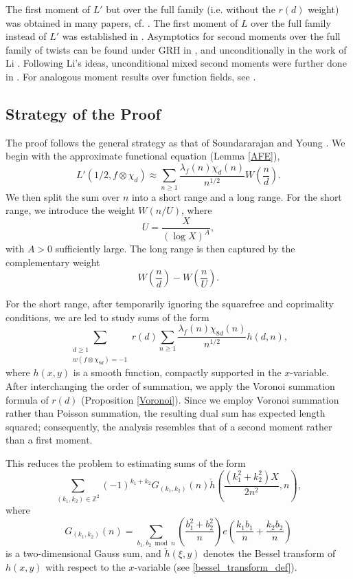 \documentclass[12pt]{amsart}
\def\log{\operatorname{log}}
\begin{document}
The first moment of $L'$ but over the full family (i.e. without the $r(d)$ weight) was obtained in many papers, cf. \cite{MurtyMurty,iwaniec}. The first moment of $L$ over the full family instead of $L'$ was established in \cite{iwaniec, radzsound, shen22}. Asymptotics for second moments over the full family of twists can be found under GRH in \cite{soundyoung, Petrow}, and unconditionally in the work of Li \cite{XLi}. Following Li's ideas, unconditional mixed second moments were further done in \cite{Kumar,zhou, huang2025averagingquadraticallytwistedlvalues, chen26}. For analogous moment results over function fields, see \cite{florea}. 

\subsection{Strategy of the Proof}
The proof follows the general strategy as that of Soundararajan and Young \cite{soundyoung}. We begin with the approximate functional equation (Lemma \ref{AFE}),
$$
L'(1/2,f\otimes \chi_d)
\approx
\sum_{n\ge 1}\frac{\lambda_f(n)\chi_d(n)}{n^{1/2}}
W\left(\frac{n}{d}\right).
$$
We then split the sum over $n$ into a short range and a long range. For the short range, we introduce the weight $W(n/U)$, where
$$
U=\frac{X}{(\log X)^A},
$$
with $A>0$ sufficiently large. The long range is then captured by the complementary weight
$$
W\left(\frac{n}{d}\right)-W\left(\frac{n}{U}\right).
$$

For the short range, after temporarily ignoring the squarefree and coprimality conditions, we are led to study sums of the form
$$
\sum_{\substack{d\ge1\\ w(f\otimes\chi_{8d})=-1}}
r(d)
\sum_{n\ge1}
\frac{\lambda_f(n)\chi_{8d}(n)}{n^{1/2}}
h(d,n),
$$
where $h(x,y)$ is a smooth function, compactly supported in the $x$-variable. After interchanging the order of summation, we apply the Voronoi summation formula of $r(d)$ (Proposition \ref{Voronoi}). Since we employ Voronoi summation rather than Poisson summation, the resulting dual sum has expected length squared; consequently, the analysis resembles that of a second moment rather than a first moment.

This reduces the problem to estimating sums of the form
$$
\sum_{(k_1,k_2)\in\mathbb Z^2}
(-1)^{k_1+k_2}
G_{(k_1,k_2)}(n)
\check{h}\left(
\frac{(k_1^2+k_2^2)X}{2n^2},
n
\right),
$$
where
$$
G_{(k_1,k_2)}(n)
=
\sum_{b_1,b_2\bmod n}
\left(\frac{b_1^2+b_2^2}{n}\right)
e\left(
\frac{k_1b_1}{n}
+
\frac{k_2b_2}{n}
\right)
$$
is a two-dimensional Gauss sum, and $\check{h}(\xi,y)$ denotes the Bessel transform of $h(x,y)$ with respect to the $x$-variable (see \eqref{bessel_transform_def}).
\end{document}
